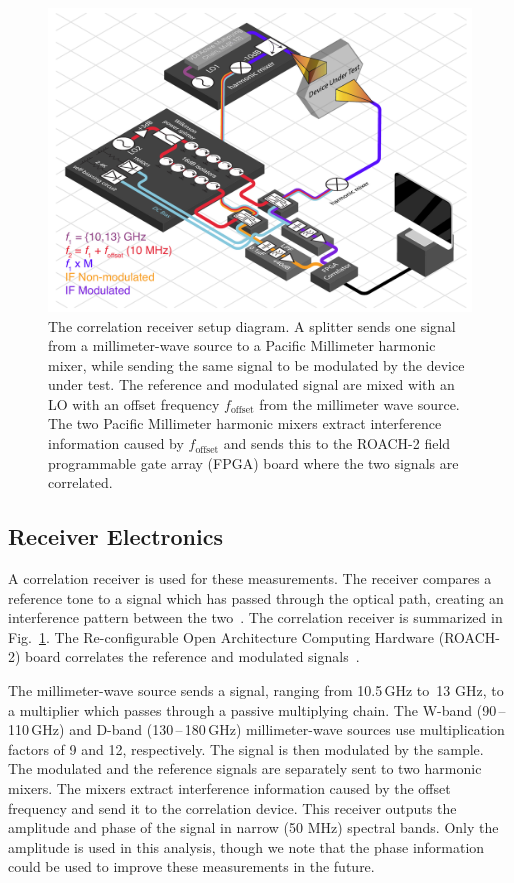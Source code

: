 \begin{figure}[t]
    \centering
    \includegraphics[width = .95\textwidth]{Figures/refl_isometric.pdf}
    \caption{The correlation receiver setup diagram. A splitter sends one signal from a millimeter-wave source to a Pacific Millimeter harmonic mixer, while sending the same signal to be modulated by the device under test. The reference and modulated signal are mixed with an LO with an offset frequency $f_{\textrm{offset}}$ from the millimeter wave source. The two Pacific Millimeter harmonic mixers extract interference information caused by $f_{\textrm{offset}}$ and sends this to the ROACH-2 field programmable gate array (FPGA) board where the two signals are correlated.}
    \label{fig:holog_ref_setup}
\end{figure}

\subsection{Receiver Electronics}

A correlation receiver is used for these measurements. The receiver compares a reference tone to a signal which has passed through the optical path, creating an interference pattern between the two~\cite{ches18}. The correlation receiver is summarized in Fig.~\ref{fig:holog_ref_setup}.  The Re-configurable Open Architecture Computing Hardware (ROACH-2) board correlates the reference and modulated signals~\cite{roach2}.

The millimeter-wave source sends a signal, ranging from 10.5\,GHz to \,13 GHz, to a multiplier which passes through a passive multiplying chain. The W-band (90\,--\,110\,GHz) and D-band (130\,--\,180\,GHz) millimeter-wave sources use multiplication factors of 9 and 12, respectively. The signal is then modulated by the sample. The modulated and the reference signals are separately sent to two harmonic mixers. The mixers extract interference information caused by the offset frequency and send it to the correlation device. This receiver outputs the amplitude and phase of the signal in narrow (50 MHz) spectral bands.  Only the amplitude is used in this analysis, though we note that the phase information could be used to improve these measurements in the future.

